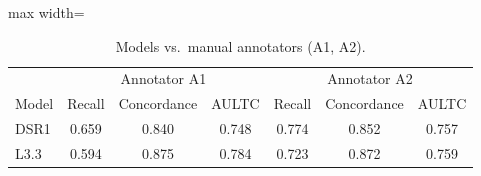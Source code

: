\begin{table}[htbp]
\caption{Models vs.\ manual annotators (A1, A2).}
\ChSixTableBodyStart
\begin{ChSixFloatBody}

\centering
\small


\begin{adjustbox}{max width=\columnwidth}
\begin{tabular}{lccc|ccc}
\toprule
& \multicolumn{3}{c|}{Annotator A1} & \multicolumn{3}{c}{Annotator A2} \\
Model & Recall & Concordance & AULTC & Recall & Concordance & AULTC \\
\midrule
DSR1 & 0.659 & 0.840 & 0.748 & 0.774 & 0.852 & 0.757 \\
L3.3  & 0.594 & 0.875 & 0.784 & 0.723 & 0.872 & 0.759 \\
\bottomrule
\end{tabular}
\end{adjustbox}

\end{ChSixFloatBody}
\end{table}
